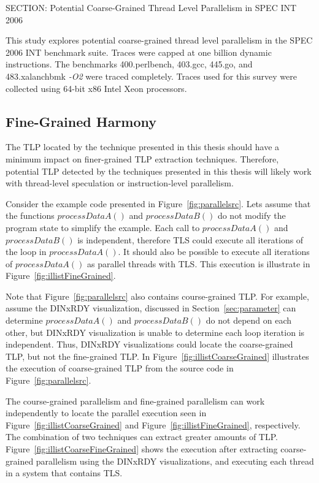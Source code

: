 {SECTION: Potential Coarse-Grained Thread Level Parallelism in SPEC INT 2006


This study explores potential coarse-grained thread level parallelism in the SPEC 2006 INT benchmark suite.  Traces were capped at one billion dynamic instructions.  The benchmarks 400.perlbench, 403.gcc, 445.go, and 483.xalanchbmk \textit{-O2} were traced completely. Traces used for this survey were collected using 64-bit x86 Intel Xeon processors.

\subsection{Fine-Grained Harmony}

The TLP located by the technique presented in this thesis should have a minimum impact on finer-grained TLP extraction techniques. Therefore, potential TLP detected by the techniques presented in this thesis will likely work  with thread-level speculation or instruction-level parallelism.

Consider the example code presented in Figure~\ref{fig:parallelsrc}. Lets assume that the functions $processDataA()$ and $processDataB()$ do not modify the program state to simplify the example. Each call to $processDataA()$ and $processDataB()$ is independent, therefore TLS could execute all iterations of the loop in $processDataA()$.  It should also be possible to execute all iterations of $processDataA()$ as parallel threads with TLS.  This execution is illustrate in Figure~\ref{fig:illistFineGrained}.

Note that Figure~\ref{fig:parallelsrc} also contains course-grained TLP.  For example, assume the DINxRDY visualization, discussed in Section~\ref{sec:parameter} can determine $processDataA()$ and $processDataB()$ do not depend on each other, but DINxRDY visualization is unable to determine each loop iteration is independent.  Thus, DINxRDY visualizations could locate the coarse-grained TLP, but not the fine-grained TLP.  In Figure~\ref{fig:illistCoarseGrained} illustrates the execution of coarse-grained TLP from the source code in Figure~\ref{fig:parallelsrc}.

The course-grained parallelism and fine-grained parallelism can work independently to locate the parallel execution seen in Figure~\ref{fig:illistCoarseGrained} and Figure~\ref{fig:illistFineGrained}, respectively.  The combination of two techniques can extract greater amounts of TLP. Figure~\ref{fig:illistCoarseFineGrained} shows the execution after extracting coarse-grained parallelism using the DINxRDY visualizations, and executing each thread in a system that contains TLS.

}
